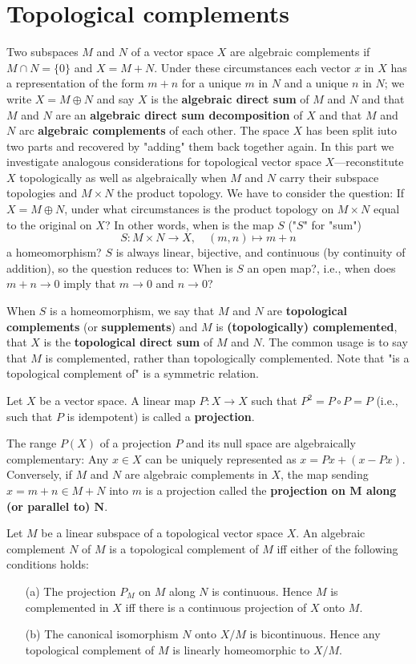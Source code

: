 \section{Topological complements}
Two subspaces $M$ and $N$ of a vector space $X$ are algebraic complements if $M\cap N=\{0\}$ and $X=M+N$. Under these circumstances each vector $x$ in $X$ has a representation of the form $m+n$ for a unique $m$ in $N$ and a unique $n$ in $N$; we write $X=M\oplus N$ and say $X$ is the \textbf{algebraic direct sum} of $M$ and $N$ and that $M$ and $N$ are an \textbf{algebraic direct sum decomposition} of $X$ and that $M$ and $N$ arc \textbf{algebraic complements} of each other. The space $X$ has been split iuto two parts and recovered by "adding" them back together again. In this part we investigate analogous considerations for topological vector space $X$---reconstitute $X$ topologically as well as algebraically when $M$ and $N$ carry their subspace topologies and $M\times N$ the product topology. We have to consider the question: If $X=M\oplus N$, under what circumstances is the product topology on $M\times N$ equal to the original on $X$? In other words, when is the map $S$ ("$S$" for "sum")
\[S:M\times N\to X,\quad (m,n)\mapsto m+n\]
a homeomorphism? $S$ is always linear, bijective, and continuous (by continuity of addition), so the question reduces to: When is $S$ an open map?, i.e., when does $m+n\to 0$ imply that $m\to 0$ and $n\to 0$?\par
When $S$ is a homeomorphism, we say that $M$ and $N$ are \textbf{topological complements} (or \textbf{supplements}) and $M$ is \textbf{(topologically) complemented}, that $X$ is the \textbf{topological direct sum} of $M$ and $N$. The common usage is to say that $M$ is complemented, rather than topologically complemented. Note that "is a topological complement of" is a symmetric relation.
\begin{definition}
Let $X$ be a vector space. A linear map $P:X\to X$ such that $P^2=P\circ P=P$ (i.e., such that $P$ is idempotent) is called a \textbf{projection}.
\end{definition}
The range $P(X)$ of a projection $P$ and its null space are algebraically complementary: Any $x\in X$ can be uniquely represented as $x=Px+(x-Px)$. Conversely, if $M$ and $N$ are algebraic complements in $X$, the map sending $x=m+n\in M+N$ into $m$ is a projection called the \textbf{projection on $\bm{M}$ along (or parallel to) $\bm{N}$}.
\begin{theorem}\label{TVS topological complement iff}
Let $M$ be a linear subspace of a topological vector space $X$. An algebraic complement $N$ of $M$ is a topological complement of $M$ iff either of the following conditions holds:
\begin{itemize}
\item[(a)] The projection $P_M$ on $M$ along $N$ is continuous. Hence $M$ is complemented in $X$ iff there is a continuous projection of $X$ onto $M$.
\item[(b)] The canonical isomorphism $N$ onto $X/M$ is bicontinuous. Hence any topological complement of $M$ is linearly homeomorphic to $X/M$.
\end{itemize}
\end{theorem}
